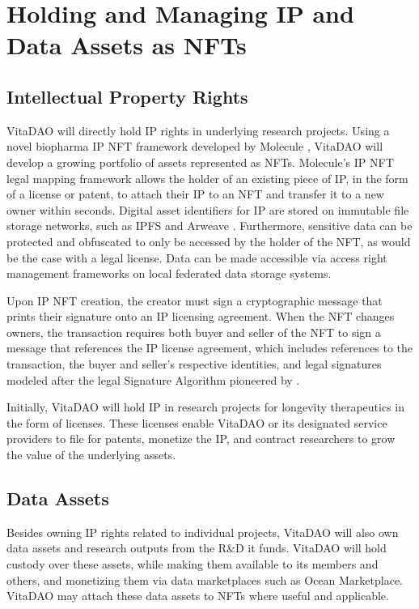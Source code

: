 \documentclass[10pt,letterpaper]{article}
\begin{document}
\section{Holding and Managing IP and Data Assets as NFTs}

\subsection{Intellectual Property Rights}
VitaDAO will directly hold IP rights in underlying research projects. Using a novel biopharma IP NFT framework developed by Molecule \citep{Kohlhaas}, VitaDAO will develop a growing portfolio of assets represented as NFTs. Molecule’s IP NFT legal mapping framework allows the holder of an existing piece of IP, in the form of a license or patent, to attach their IP to an NFT and transfer it to a new owner within seconds. Digital asset identifiers for IP are stored on immutable file storage networks, such as IPFS \citep{IPFS} and Arweave \citep{Arweave}. Furthermore, sensitive data can be protected and obfuscated to only be accessed by the holder of the NFT, as would be the case with a legal license. Data can be made accessible via access right management frameworks on local federated data storage systems.

Upon IP NFT creation, the creator must sign a cryptographic message that prints their signature onto an IP licensing agreement. When the NFT changes owners, the transaction requires both buyer and seller of the NFT to sign a message that references the IP license agreement, which includes references to the transaction, the buyer and seller’s respective identities, and legal signatures modeled after the legal Signature Algorithm pioneered by \citep{OpenLaw2019}. 

Initially, VitaDAO will hold IP in research projects for longevity therapeutics in the form of licenses. These licenses enable VitaDAO or its designated service providers to file for patents, monetize the IP, and contract researchers to grow the value of the underlying assets. 

\subsection{Data Assets}
Besides owning IP rights related to individual projects, VitaDAO will also own data assets and research outputs from the R\&D it funds. VitaDAO will hold custody over these assets, while making them available to its members and others, and monetizing them via data marketplaces such as Ocean Marketplace. VitaDAO may attach these data assets to NFTs where useful and applicable.
 
\end{document}
